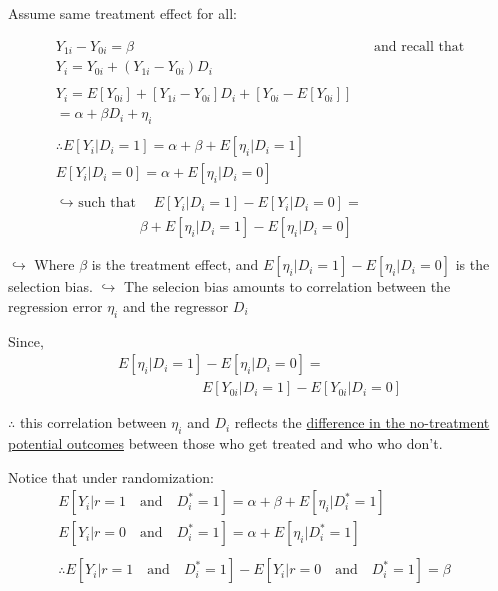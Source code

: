 \vspace{4 mm}

\newline \noindent Assume same treatment effect for all:

\begin{eqnarray}
Y_{1i} - Y_{0i} = \beta & \text{and recall that}\\
  Y_{i} = Y_{0i} + (Y_{1i}-Y_{0i})D_{i} \\
& \nonumber \\
Y_{i} = E[Y_{0i}] + [Y_{1i}-Y_{0i}]D_{i} + [Y_{0i}-E[Y_{0i}]] \\
=\alpha+\beta D_{i} + \eta_{i} \quad \qquad \qquad \qquad  \qquad \qquad\\
& \nonumber \\
\therefore E[Y_{i}|D_{i}=1] = \alpha + \beta + E[\eta_{i}|D_{i}=1] \\
 E[Y_{i}|D_{i}=0] = \alpha + E[\eta_{i}|D_{i}=0]\\
 & \nonumber \\
 \text{$\hookrightarrow$ such that} \quad E[Y_{i}|D_{i}=1] - E[Y_{i}|D_{i}=0] = \\
 \qquad \qquad \qquad \beta + E[\eta_{i}|D_{i}=1] - E[\eta_{i}|D_{i}=0] 
\end{eqnarray}

 $\hookrightarrow$ Where $\beta$ is the treatment effect, and $E[\eta_{i}|D_{i}=1] - E[\eta_{i}|D_{i}=0]$ is the selection bias.
\newline \indent $\hookrightarrow$ The selecion bias amounts to correlation between the regression error $\eta_{i}$ and the regressor $D_{i}$ 


\vspace{4 mm}
Since,
\begin{eqnarray}
E[\eta_{i}|D_{i}=1] - E[\eta_{i}|D_{i}=0] = \\
\qquad \qquad \qquad E[Y_{0i}|D_{i}=1] - E[Y_{0i}|D_{i}=0] 
\end{eqnarray}

\noindent $\therefore$ this correlation between $\eta_{i}$ and $D_{i}$ reflects the \underline{difference in the no-treatment potential outcomes} between those who get treated and who who don't.

\vspace{4 mm}

Notice that under randomization:
\begin{eqnarray}
E[Y_{i}|r=1 \quad \text{and} \quad D_{i}^{*}=1] = \alpha +\beta + E[\eta_{i}|D_{i}^{*}=1] \\
E[Y_{i}|r=0 \quad \text{and} \quad D_{i}^{*}=1] = \alpha + E[\eta_{i}|D_{i}^{*}=1] \qquad \\
& \nonumber \\
\therefore E[Y_{i}|r=1 \quad \text{and} \quad D_{i}^{*}=1] - E[Y_{i}|r=0 \quad \text{and} \quad D_{i}^{*}=1] = \beta
\end{eqnarray}

